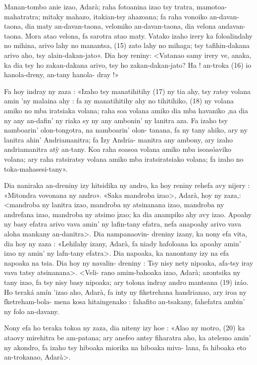 Manan-tombo anie izao, Adarà; raha fotoanina izao tsy tratra, mamotoa-
mahatratra; mitaky mahazo, itakian-tsy ahazoana; fa raha vonoiko an-davan-
taona, dia maty an-davan-taona, velomiko an-davan-taona, dia velona
andavan-taona. Mora atao velona, fa sarotra atao maty. Vatako izaho irery
ka foloalindahy no mihina, arivo lahy no manantsa, (15) zato lahy no
mihaga; tsy tafihin-dakana arivo aho, tsy alain-dakan-jato». Dia hoy reniny:
<Vatanao samy irery ve, anaka, ka dia tsy ho zakan-dakana arivo, tsy ho
zakan-dakan-jato? Ha ! an-troka (16) io hanola-dreny, an-tany hanola-
dray !»

Fa hoy indray ny zaza : «Izaho tsy manatihitihy (17) ny tia ahy, tsy
ratsy volana amin 'ny malaina ahy : fa ny manatihitihy ahy no tihitihiko,
(18) ny volana amiko no mba iratsiaka volana; raha soa volana amiko dia
mba havaniko ,na dia ny any an-dafin' ny riaka sy ny any ambonin' ny
lanitra aza. Fa izaho tsy namboarin' olon-tongotra, na namboarin' olon-
tanana, fa ny tany ahiko, ary ny lanitra ahin' Andriamanitra; fa Izy Andria-
manitra any ambony, ary izaho andriamanitra atỳ an-tany. Koa raha soasoa
volana amiko mba isoasóaviko volana; ary raha ratsiratsy volana amiko mba
iratsiratsiako volana; fa izaho no toka-mahasesi-tany».

Dia naniraka an-dreniny izy hitsidika ny andro, ka hoy reniny rehefa
avy nijery : «Mitondra vovonana ny andro». «Saka mandroba izao>, Adarà,
hoy ny zaza,: <mandroba ny lanitra izao, mandroba ny atsinanana izao,
mandroba ny andrefana izao, mandroba ny atsimo įzao; ka dia anampiko
ahy avy izao. Apoahy ny basy efatra arivo vava amin' ny lafin-tany efatra,
nefa anapoahy arivo vava aloha mankany an-danitra>. Dia nampanaovin-
dreniny izany, ka nony efa vita, dia hoy ny zaza : «Lehilahy izany, Adarà,
fa niady hafoloana ka apoahy amin' izao ny amin' ny lafn-tany efatra>.
Dia napoaka, ka nanontany izy na efa napoaka na tsia. Dia hoy ny navalin-
dreniny : Tsy nisy nety nipoaka, afa-tsy iray vava tatsy atsinanana>. <Veli-
rano amim-bahoaka izao, Adarà; azontsika ny tany izao, fa tsy nisy basy
nipoaka; ary tolona indray andro mantsana (19) izáo. Ho teraká amín 'izao
aho, Adarà, fa inty ny fiketrehana handrianao, ary iroa ny fketreham-bola-
mena kosa hitaingenako : fahafito an-tsakany, fahefatra ambin' ny folo
an-davany.

Nony efa ho teraka tokoa ny zaza, dia niteny izy hoe : «Alao ny motro,
(20) ka ataovy mirehitra be am-patana; ary anefeo antsy fiharatra aho, ka
atelemo amin' ny akondro, fa izaho tsy hiboaka miorika na hiboaka miva-
lana, fa hiboaka eto an-trokanao, Adarà>.


